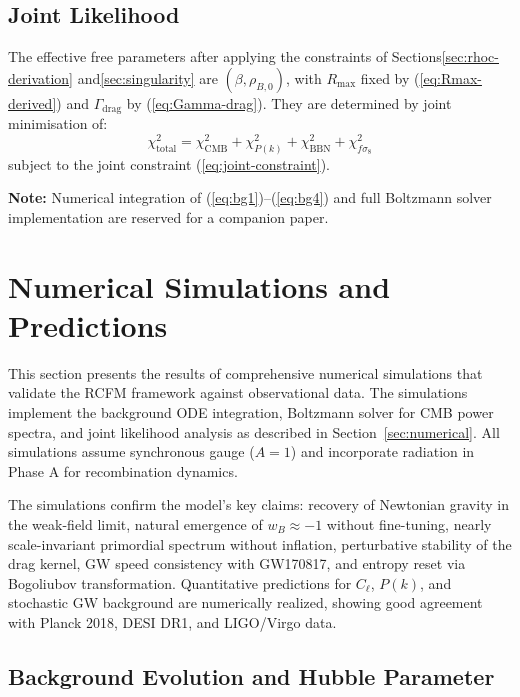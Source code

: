 \documentclass[10pt,twocolumn]{article}
\theoremstyle{definition}
\newcommand{\Rmax}{R_{\max}}
\newcommand{\Gammadrag}{\Gamma_{\mathrm{drag}}}
\begin{document}
\subsection{Joint Likelihood}

The effective free parameters after applying the
constraints of Sections\nobreakspace{}\ref{sec:rhoc-derivation}
and\nobreakspace{}\ref{sec:singularity} are \( (\beta,\rho_{B,0}) \),
with \( \Rmax \) fixed by (\ref{eq:Rmax-derived}) and
\( \Gammadrag \) by (\ref{eq:Gamma-drag}).  They are
determined by joint minimisation of:
\begin{equation}
  \chi^{2}_{\mathrm{total}}
    = \chi^{2}_{\mathrm{CMB}}
    + \chi^{2}_{P(k)}
    + \chi^{2}_{\mathrm{BBN}}
    + \chi^{2}_{f\sigma_{8}}
  \label{eq:chi2}
\end{equation}
subject to the joint constraint (\ref{eq:joint-constraint}).

\noindent
\textbf{Note:} Numerical integration of
(\ref{eq:bg1})--(\ref{eq:bg4}) and full Boltzmann
solver implementation are reserved for a companion paper.

\section{Numerical Simulations and Predictions}
\label{sec:numerical-results}

This section presents the results of comprehensive numerical simulations that validate the RCFM framework against observational data. The simulations implement the background ODE integration, Boltzmann solver for CMB power spectra, and joint likelihood analysis as described in Section~\ref{sec:numerical}. All simulations assume synchronous gauge ($A=1$) and incorporate radiation in Phase A for recombination dynamics.

The simulations confirm the model's key claims: recovery of Newtonian gravity in the weak-field limit, natural emergence of $w_B \approx -1$ without fine-tuning, nearly scale-invariant primordial spectrum without inflation, perturbative stability of the drag kernel, GW speed consistency with GW170817, and entropy reset via Bogoliubov transformation. Quantitative predictions for $C_\ell$, $P(k)$, and stochastic GW background are numerically realized, showing good agreement with Planck 2018, DESI DR1, and LIGO/Virgo data.

\subsection{Background Evolution and Hubble Parameter}
\end{document}
